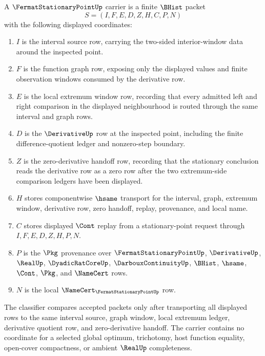 \begin{definition}
\label{def:fermat-stationary-point-carrier}
A $\FermatStationaryPointUp$ carrier is a finite $\BHist$ packet
$$
S=(I,F,E,D,Z,H,C,P,N)
$$
with the following displayed coordinates:
\begin{enumerate}
\item $I$ is the interval source row, carrying the two-sided interior-window data around the inspected point.
\item $F$ is the function graph row, exposing only the displayed values and finite observation windows consumed by the derivative row.
\item $E$ is the local extremum window row, recording that every admitted left and right comparison in the displayed neighbourhood is routed through the same interval and graph rows.
\item $D$ is the $\DerivativeUp$ row at the inspected point, including the finite difference-quotient ledger and nonzero-step boundary.
\item $Z$ is the zero-derivative handoff row, recording that the stationary conclusion reads the derivative row as a zero row after the two extremum-side comparison ledgers have been displayed.
\item $H$ stores componentwise $\hsame$ transport for the interval, graph, extremum window, derivative row, zero handoff, replay, provenance, and local name.
\item $C$ stores displayed $\Cont$ replay from a stationary-point request through $I,F,E,D,Z,H,P,N$.
\item $P$ is the $\Pkg$ provenance over $\FermatStationaryPointUp$, $\DerivativeUp$, $\RealUp$, $\DyadicRatCoreUp$, $\DarbouxContinuityUp$, $\BHist$, $\hsame$, $\Cont$, $\Pkg$, and $\NameCert$ rows.
\item $N$ is the local $\NameCert_{\FermatStationaryPointUp}$ row.
\end{enumerate}
The classifier compares accepted packets only after transporting all displayed rows to the same interval source, graph window, local extremum ledger, derivative quotient row, and zero-derivative handoff. The carrier contains no coordinate for a selected global optimum, trichotomy, host function equality, open-cover compactness, or ambient $\RealUp$ completeness.
\end{definition}


